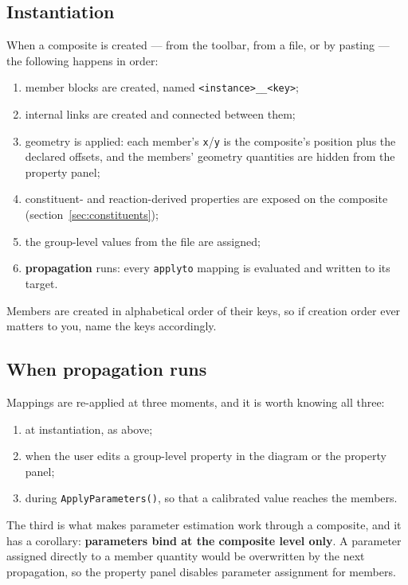 \documentclass[11pt,a4paper]{article}
\newcommand{\code}[1]{\texttt{\small #1}}
\begin{document}
\subsection{Instantiation}

When a composite is created --- from the toolbar, from a file, or by pasting
--- the following happens in order:

\begin{enumerate}[leftmargin=1.6em]
\item member blocks are created, named \code{<instance>\_\_<key>};
\item internal links are created and connected between them;
\item geometry is applied: each member's \code{x}/\code{y} is the composite's
position plus the declared offsets, and the members' geometry quantities are
hidden from the property panel;
\item constituent- and reaction-derived properties are exposed on the composite
(section~\ref{sec:constituents});
\item the group-level values from the file are assigned;
\item \textbf{propagation} runs: every \code{applyto} mapping is evaluated and
written to its target.
\end{enumerate}

\noindent
Members are created in alphabetical order of their keys, so if creation order
ever matters to you, name the keys accordingly.

\subsection{When propagation runs}

Mappings are re-applied at three moments, and it is worth knowing all three:

\begin{enumerate}[leftmargin=1.6em]
\item at instantiation, as above;
\item when the user edits a group-level property in the diagram or the property
panel;
\item during \code{ApplyParameters()}, so that a calibrated value reaches the
members.
\end{enumerate}

\noindent
The third is what makes parameter estimation work through a composite, and it
has a corollary: \textbf{parameters bind at the composite level only}. A
parameter assigned directly to a member quantity would be overwritten by the
next propagation, so the property panel disables parameter assignment for
members.
\end{document}
